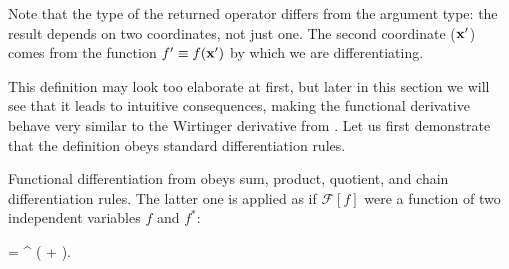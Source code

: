 Note that the type of the returned operator differs from the argument type: the result depends on two coordinates, not just one.
The second coordinate ($\mathbf{x}^\prime$) comes from the function $f^\prime \equiv f(\mathbf{x}^\prime)$ by which we are differentiating.

This definition may look too elaborate at first, but later in this section we will see that it leads to intuitive consequences, making the functional derivative behave very similar to the Wirtinger derivative from .
Let us first demonstrate that the definition obeys standard differentiation rules.

\begin{theorem}
	Functional differentiation from  obeys sum, product, quotient, and chain differentiation rules.
	The latter one is applied as if $\mathcal{F}[f]$ were a function of two independent variables $f$ and $f^*$:
	\begin{eqn*}
			= \int \upd\xvec^{\prime\prime} \left(
				+ 
			\right).
	\end{eqn*}
\end{theorem}
